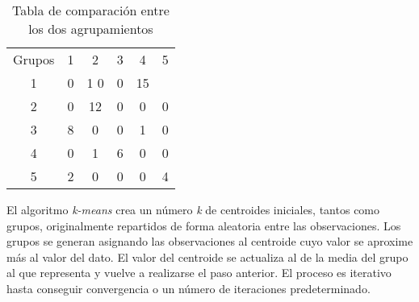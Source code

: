 \documentclass[11pt,a4paper]{article}
\begin{document}
\begin{table}[ht]
\centering
\begin{tabular}{cccccc}
\toprule[0.4mm]
Grupos & 1 & 2 & 3 & 4 & 5\\
1 & 0 & 1 0 & 0 & 15\\
2 & 0 & 12 & 0 & 0 & 0\\
3 & 8 & 0 & 0 & 1 & 0\\
4 & 0 & 1 & 6 & 0 & 0\\
5 & 2 & 0 & 0 & 0 & 4\\
\bottomrule[0.4mm]
\end{tabular}
\caption{Tabla de comparación entre los dos agrupamientos}
\label{tab:comp}
\end{table}

\newpage
El algoritmo \textit{k-means} crea un número \textit{k} de centroides iniciales, tantos como grupos, originalmente repartidos de forma aleatoria entre las observaciones. Los grupos se generan asignando las observaciones al centroide cuyo valor se aproxime más al valor del dato. El valor del centroide se actualiza al de la media del grupo al que representa y vuelve a realizarse el paso anterior. El proceso es iterativo hasta conseguir convergencia o un número de iteraciones predeterminado.
\end{document}
